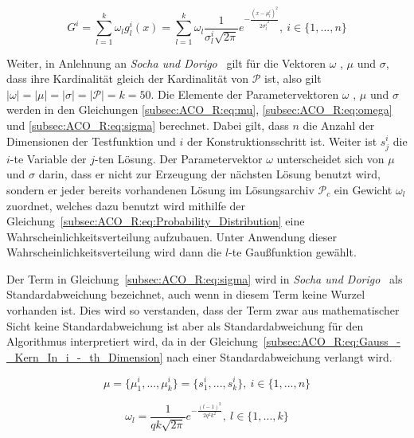\documentclass[fontsize=12, a4aper]{scrartcl}
\begin{document}
	\begin{equation} \label{subsec:ACO_R:eq:Gauss_-_Kern_In_i_-_th_Dimension}
		G^i=\sum_{l=1}^{k} \omega_l g^i_l(x)=\sum_{l=1}^{k} \omega_l \frac{1}{ \sigma^i_l \sqrt{2\pi} }e^{-\frac{(x-\mu^i_l)^2}{2 {\sigma^i_l}^2}}, ~  i \in \{1, ..., n\}
	\end{equation}
	
	\noindent Weiter, in Anlehnung an \textit{Socha und Dorigo}~\cite{socha2008ant} gilt für die Vektoren \(\omega\) , \(\mu\) und \(\sigma\), dass ihre Kardinalität gleich der Kardinalität von \(\mathcal{P}\) ist, also gilt \(|\omega| = |\mu| = |\sigma| = |\mathcal{P}| = k = 50\). Die Elemente der Parametervektoren \(\omega\) , \(\mu\) und \(\sigma\) werden in den Gleichungen \ref{subsec:ACO_R:eq:mu}, \ref{subsec:ACO_R:eq:omega} und \ref{subsec:ACO_R:eq:sigma} berechnet. Dabei gilt, dass \(n\) die Anzahl der Dimensionen der Testfunktion und \(i\) der Konstruktionsschritt ist. Weiter ist \(s^i_j\) die \(i\)-te Variable der \(j\)-ten Lösung. Der Parametervektor \(\omega\) unterscheidet sich von \(\mu\) und \(\sigma\) darin, dass er nicht zur Erzeugung der nächsten Lösung benutzt wird, sondern er jeder bereits vorhandenen Lösung im Lösungsarchiv \(\mathcal{P}_c\) ein Gewicht \(\omega_l\) zuordnet, welches dazu benutzt wird mithilfe der Gleichung~\ref{subsec:ACO_R:eq:Probability_Distribution} eine Wahrscheinlichkeitsverteilung aufzubauen. Unter Anwendung dieser Wahrscheinlichkeitsverteilung wird dann die \(l\)-te Gaußfunktion gewählt.\hfill\newline
	
	Der Term in Gleichung~\ref{subsec:ACO_R:eq:sigma} wird in \textit{Socha und Dorigo}~\cite{socha2008ant} als Standardabweichung bezeichnet, auch wenn in diesem Term keine Wurzel vorhanden ist. Dies wird so verstanden, dass der Term zwar aus mathematischer Sicht keine Standardabweichung ist aber als Standardabweichung für den Algorithmus interpretiert wird, da in der Gleichung~\ref{subsec:ACO_R:eq:Gauss_-_Kern_In_i_-_th_Dimension} nach einer Standardabweichung verlangt wird.
	
	\begin{equation} \label{subsec:ACO_R:eq:mu}
		\mu = \{ \mu^i_1, ...,\mu^i_k \} = \{ s^i_1, ..., s^i_k \}, ~ i \in \{1, ..., n\}
	\end{equation}
	
	\begin{equation} \label{subsec:ACO_R:eq:omega}
		\omega_l = \frac{1}{qk\sqrt{2\pi}}e^{-\frac{(l-1)^2}{2q^2k^2}}, ~ 
		l \in \{1, ..., k\}
	\end{equation}
	
\end{document}
